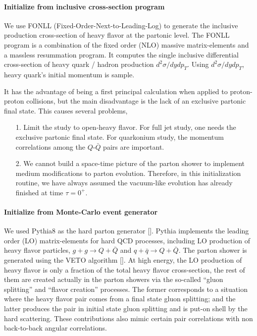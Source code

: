 \paragraph{Initialize from inclusive cross-section program}
We use FONLL (Fixed-Order-Next-to-Leading-Log) to generate the inclusive production cross-section of heavy flavor at the partonic level.
The FONLL program is a combination of the fixed order (NLO) massive matrix-elements and a massless resummation program.
It computes the single inclusive differential cross-section of heavy quark / hadron production $d^2\sigma/dydp_T$.
Using $d^2\sigma/dydp_T$, heavy quark's initial momentum is sample.

It has the advantage of being a first principal calculation when applied to proton-proton collisions, but the main disadvantage is the lack of an exclusive partonic final state.
This causes several problems,
\begin{itemize}
\item[1.] Limit the study to open-heavy flavor.
For full jet study, one needs the exclusive partonic final state. For quarkonium study, the momentum correlations among the $Q$-$\bar{Q}$ pairs are important.
\item[2.] We cannot build a space-time picture of the parton shower to implement medium modifications to parton evolution. 
Therefore, in this initialization routine, we have always assumed the vacuum-like evolution has already finished at time $\tau=0^{+}$.
\end{itemize}

\paragraph{Initialize from Monte-Carlo event generator}
We used Pythia8 as the hard parton generator [].
Pythia implements the leading order (LO) matrix-elements for hard QCD processes, including LO production of heavy flavor particles,
$g+g\rightarrow Q+\bar{Q}$ and $q+\bar{q}\rightarrow Q+\bar{Q}$.
The parton shower is generated using the VETO algorithm [].
At high energy, the LO production of heavy flavor is only a fraction of the total heavy flavor cross-section, the rest of them are created actually in the parton showers via the so-called ``gluon splitting'' and ``flavor creation'' processes.
The former corresponds to a situation where the heavy flavor pair comes from a final state gluon splitting; and the latter produces the pair in initial state gluon splitting and is put-on shell by the hard scattering.
These contributions also mimic certain pair correlations with non back-to-back angular correlations.

